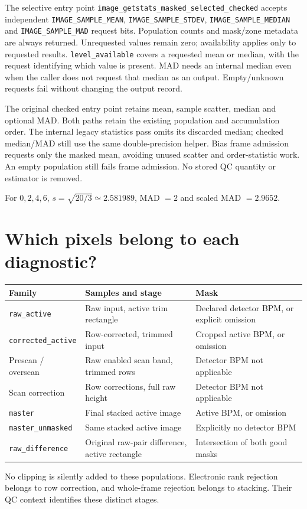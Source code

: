 \documentclass[11pt,a4paper]{article}
\newcommand{\code}[1]{\nolinkurl{#1}}
\begin{document}
The selective entry point
\code{image_getstats_masked_selected_checked} accepts independent
\code{IMAGE_SAMPLE_MEAN}, \code{IMAGE_SAMPLE_STDEV},
\code{IMAGE_SAMPLE_MEDIAN} and \code{IMAGE_SAMPLE_MAD} request bits.
Population counts and mask/zone metadata are always returned. Unrequested
values remain zero; availability applies only to requested results.
\code{level_available} covers a requested mean or median, with the request
identifying which value is present. MAD needs an internal median even when
the caller does not request that median as an output. Empty/unknown requests
fail without changing the output record.

The original checked entry point retains mean, sample scatter, median and
optional MAD. Both paths retain the existing population and accumulation
order. The internal legacy statistics pass omits its discarded median;
checked median/MAD still use the same double-precision helper. Bias frame
admission requests only the masked mean, avoiding unused scatter and
order-statistic work. An empty population still fails frame admission.
No stored QC quantity or estimator is removed.

For $0,2,4,6$, $s=\sqrt{20/3}\simeq2.581989$, MAD $=2$ and
scaled MAD $=2.9652$.

\newpage
\section{Which pixels belong to each diagnostic?}
\begin{center}\small
\begin{tabular}{>{\raggedright\arraybackslash}p{32mm}>{\raggedright\arraybackslash}p{49mm}>{\raggedright\arraybackslash}p{55mm}}
\toprule Family & Samples and stage & Mask \\\midrule
\code{raw_active} & Raw input, active trim rectangle & Declared detector BPM, or explicit omission \\
\code{corrected_active} & Row-corrected, trimmed input & Cropped active BPM, or omission \\
Prescan / overscan & Raw enabled scan band, trimmed rows & Detector BPM not applicable \\
Scan correction & Row corrections, full raw height & Detector BPM not applicable \\
\code{master} & Final stacked active image & Active BPM, or omission \\
\code{master_unmasked} & Same stacked active image & Explicitly no detector BPM \\
\code{raw_difference} & Original raw-pair difference, active rectangle & Intersection of both good masks \\
\bottomrule
\end{tabular}\end{center}
No clipping is silently added to these populations. Electronic rank rejection
belongs to row correction, and whole-frame rejection belongs to stacking.
Their QC context identifies these distinct stages.
\end{document}
